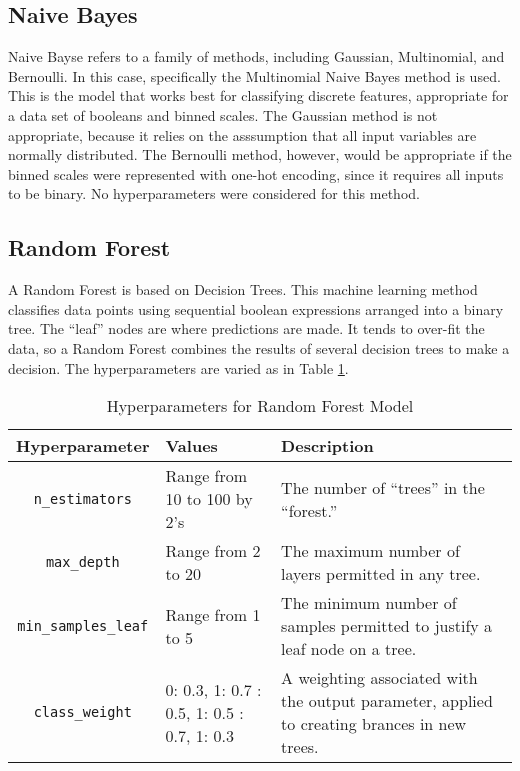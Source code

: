 \documentclass{article}
\begin{document}
\subsection{Naive Bayes}

Naive Bayse refers to a family of methods, including Gaussian, Multinomial, and Bernoulli. In this case, specifically the Multinomial Naive Bayes method is used. This is the model that works best for classifying discrete features, appropriate for a data set of booleans and binned scales. The Gaussian method is not appropriate, because it relies on the asssumption that all input variables are normally distributed. The Bernoulli method, however, would be appropriate if the binned scales were represented with one-hot encoding, since it requires all inputs to be binary. No hyperparameters were considered for this method.

\subsection{Random Forest}

A Random Forest is based on Decision Trees. This machine learning method classifies data points using sequential boolean expressions arranged into a binary tree. The ``leaf'' nodes are where predictions are made. It tends to over-fit the data, so a Random Forest combines the results of several decision trees to make a decision. The hyperparameters are varied as in Table \ref{tbl:rf_hyp}.

\begin{table}[h!]
	\centering
	\caption{Hyperparameters for Random Forest Model}
	\label{tbl:rf_hyp}
	\begin{tabular}{c|p{1in}|p{3in}}
		Hyperparameter & Values & Description \\
		\hline
		\verb|n_estimators| & Range from 10 to 100 by 2's & The number of ``trees'' in the ``forest.'' \\
		\verb|max_depth| & Range from 2 to 20 & The maximum number of layers permitted in any tree. \\
		\verb|min_samples_leaf| & Range from 1 to 5 & The minimum number of samples permitted to justify a leaf node on a tree. \\
		\verb|class_weight| & 0: 0.3, 1: 0.7 \newline 0: 0.5, 1: 0.5 \newline 0: 0.7, 1: 0.3 & A weighting associated with the output parameter, applied to creating brances in new trees.
	\end{tabular}
\end{table}
\end{document}
